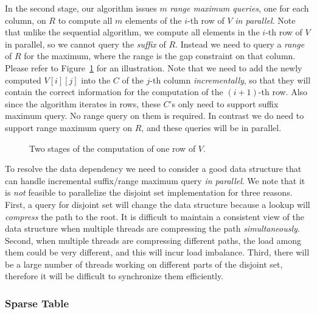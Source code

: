 In the second stage, our algorithm issues $m$ {\em range maximum
queries}, one for each column, on $R$ to compute all $m$ elements of the
$i$-th row of $V$ {\em in parallel}.  Note that unlike the sequential
algorithm, we compute all elements in the $i$-th row of $V$ in parallel,
so we cannot query the {\em suffix} of $R$.  Instead we need to query a
{\em range} of $R$ for the maximum, where the range is the gap
constraint on that column.  Please refer to
Figure~\ref{fig:fig-VGLCS-dp-rmq} for an illustration.  Note that we
need to add the newly computed $V[i][j]$ into the $C$ of the $j$-th
column {\em incrementally}, so that they will contain the correct
information for the computation of the $(i+1)$-th row.  Also since the
algorithm iterates in rows, these $C$'s only need to support suffix
maximum query.  No range query on them is required.  In contrast we do
need to support range maximum query on $R$, and these queries will be in
parallel.

\begin{figure}
  \centering {} 
  \caption{Two stages of the computation of one row of $V$.}
  \label{fig:fig-VGLCS-dp-rmq}
\end{figure}

To resolve the data dependency we need to consider a good data structure
that can handle incremental suffix/range maximum query {\em in
parallel}.  We note that it is {\em not} feasible to parallelize the
disjoint set implementation for three reasons.  First, a query for
disjoint set will change the data structure because a lookup will {\em
compress} the path to the root.  It is difficult to maintain a
consistent view of the data structure when multiple threads are
compressing the path {\em simultaneously}.  Second, when multiple
threads are compressing different paths, the load among them could be
very different, and this will incur load imbalance.  Third, there will
be a large number of threads working on different parts of the disjoint
set, therefore it will be difficult to synchronize them efficiently.

\subsubsection{Sparse Table} \label{sec:sparse-table}

